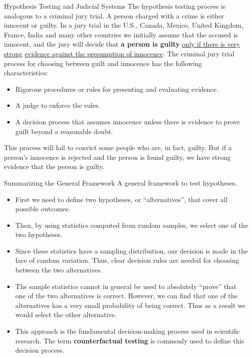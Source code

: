 \documentclass[pdf]{beamer}
\newcommand{\empr}[1]{{\color{franklinblue}\textbf{#1}}}
\theoremstyle{remark}
\theoremstyle{definition}
\begin{document}
\begin{frame}[t]{Hypothesis Testing and Judicial Systems}
\small
The hypothesis testing process is analogous to a criminal jury trial. A person
charged with a crime is either innocent or guilty. In a jury trial in the U.S., Canada, Mexico, United Kingdom, France, India and many other countries we initially assume that the accused is innocent, and the jury will decide that \textbf{a person is guilty} \underline{only if there is very strong} \underline{evidence against the presumption of innocence}.  The criminal jury trial process for choosing between guilt and innocence has the following characteristics: \\
\vspace{1.5ex}
\begin{itemize}
\item Rigorous procedures or rules for presenting and evaluating evidence.
\item A judge to enforce the rules.
\item A decision process that assumes innocence unless there is evidence to prove guilt beyond
a reasonable doubt.
\end{itemize}
This process will fail to convict some people who are, in fact, guilty. But if a person's innocence is rejected and the person is found guilty, we have strong evidence that the person is guilty.
\end{frame}

\begin{frame}[t]{Summarizing the General Framework}
A general framework to test hypotheses. \\
\vspace{0.5ex}
\small
\begin{itemize} 
  \item First we need to define two hypotheses, or ``alternatives'', that cover all possible outcomes. 
  \item Then, by using statistics computed from random samples, we select one of the two hypotheses. 
  \item Since these statistics have a sampling distribution, our decision is made in the face of random variation. Thus, clear decision rules are needed for choosing between the two alternatives. 
  \item The sample statistics cannot in general be used to absolutely ``prove'' that one of the two alternatives is correct. However, we can find that one of the alternatives has a very small probability of being correct. Thus as a result we would select the other alternative. 
  \item This approach is the fundamental decision-making process used in scientific research. The term \empr{counterfactual testing} is commonly used to define this decision process.
\end{itemize}
\end{frame}
\end{document}
